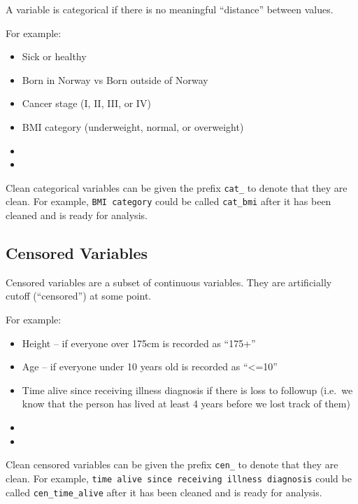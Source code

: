 \documentclass[12pt,]{article}
\providecommand{\tightlist}{%
  \setlength{\itemsep}{0pt}\setlength{\parskip}{0pt}}
\begin{document}
A variable is categorical if there is no meaningful ``distance'' between
values.

For example:

\begin{itemize}
\tightlist
\item
  Sick or healthy
\item
  Born in Norway vs Born outside of Norway
\item
  Cancer stage (I, II, III, or IV)
\item
  BMI category (underweight, normal, or overweight)
\item
  \hfill \break
  \hfill \break
\item
  \hfill \break
  \hfill \break
\end{itemize}

Clean categorical variables can be given the prefix \texttt{cat\_} to
denote that they are clean. For example, \texttt{BMI\ category} could be
called \texttt{cat\_bmi} after it has been cleaned and is ready for
analysis.

\subsection{Censored Variables}\label{censored-variables}

Censored variables are a subset of continuous variables. They are
artificially cutoff (``censored'') at some point.

For example:

\begin{itemize}
\tightlist
\item
  Height -- if everyone over 175cm is recorded as ``175+''
\item
  Age -- if everyone under 10 years old is recorded as
  ``\textless{}=10''
\item
  Time alive since receiving illness diagnosis if there is loss to
  followup (i.e.~we know that the person has lived at least 4 years
  before we lost track of them)
\item
  \hfill \break
  \hfill \break
\item
  \hfill \break
  \hfill \break
\end{itemize}

Clean censored variables can be given the prefix \texttt{cen\_} to
denote that they are clean. For example,
\texttt{time\ alive\ since\ receiving\ illness\ diagnosis} could be
called \texttt{cen\_time\_alive} after it has been cleaned and is ready
for analysis.
\end{document}
